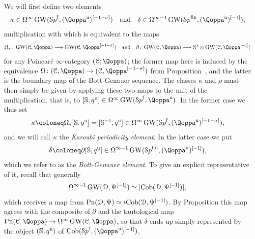 \begin{construction}
We will first define two elements 
\[
\kappa \in \Omega^\infty\GW(\Spaf,(\QF^\uni)\qshift{-1-\sigma}) \quad \text{and} \quad \delta \in \Omega^{\infty-1}\GW(\Spa^\fin,(\QF^\uni)\qshift{-1}),
\]
multiplication with which is equivalent to the maps 
\[
\Omega_\ast \colon \GW(\C,\QF) \longrightarrow \GW(\C,\QF\qshift{-1-\sigma}) \quad \text{and} \quad \partial\colon \GW(\C,\QF) \longrightarrow \SS^1 \otimes \GW(\C,\QF\qshift{-1})
\]
for any Poincaré $\infty$-category $(\C;\QF)$; the former map here is induced by the equivalence $\Om\colon (\C,\QF) \rightarrow (\C,\QF\qshift{-1-\sigma})$ from Proposition~, and the latter is the boundary map of the Bott-Genauer sequence. The classes $\kappa$ and $\rho$ must then simply be given by applying these two maps to the unit of the multiplication, that is, to $[\mathbb S,q^\uni] \in \Omega^\infty\GW(\Spaf,\QF^\uni)$.
In the former case we thus set
\[
\kappa \coloneq \Omega_\ast[\mathbb S,q^\uni] = [\mathbb S^{-1},q^\uni] \in \Omega^\infty\GW(\Spaf,(\QF^\uni)\qshift{-1-\sigma}),
\]
and we will call $\kappa$ the \emph{Karoubi periodicity element}. In the latter case we put
\[
\delta \coloneq \partial[\mathbb S,q^\uni] \in \Omega^{\infty-1}\GW(\Spa^\fin,(\QF^\uni)\qshift{-1}),
\]
which we refer to as the \emph{Bott-Genauer element}. To give an explicit representative of it, recall that generally 
\[
\Omega^{\infty-1}\operatorname{GW}(\mathcal{D},\Psi^{[-1]}) \simeq |\mathrm{Cob}(\mathcal{D},\Psi^{[-1]})|,
\]
which receives a map from $\mathrm{Pn}(\mathcal{D},\Psi) \simeq \iota\mathrm{Cob}(\mathcal{D},\Psi^{[-1]})$. By Proposition  this map agrees with the composite of $\partial$ and the tautological map $\Poinc(\C,\QF) \rightarrow \Omega^{\infty}\GW(\C,\QF)$, so that $\delta$ ends up simply represented by the object $(\mathbb S,q^{\mathrm{u}})$ of $\Cob(\Spaf,(\QF^\uni)\qshift{-1})$.




\end{construction}

